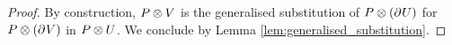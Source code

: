 \begin{proof}
    By construction, \( P \otimes V \) is the generalised substitution of \( P \otimes (\partial_{}^{} U) \) for \( P \otimes (\partial_{}^{} V) \) in \( P \otimes U \).
    We conclude by Lemma \ref{lem:generalised_substitution}.
\end{proof}

